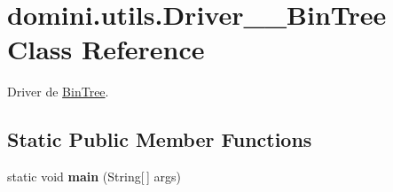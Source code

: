 \hypertarget{classdomini_1_1utils_1_1Driver____BinTree}{}\section{domini.\+utils.\+Driver\+\_\+\+\_\+\+Bin\+Tree Class Reference}
\label{classdomini_1_1utils_1_1Driver____BinTree}


Driver de \hyperlink{classdomini_1_1utils_1_1BinTree}{Bin\+Tree}.  


\subsection*{Static Public Member Functions}
\begin{DoxyCompactItemize}
\item 
\mbox{\label{classdomini_1_1utils_1_1Driver____BinTree_a08875cef02b7a770a105b0b6b976a681}} 
static void {\bfseries main} (String\mbox{[}$\,$\mbox{]} args)
\end{DoxyCompactItemize}
